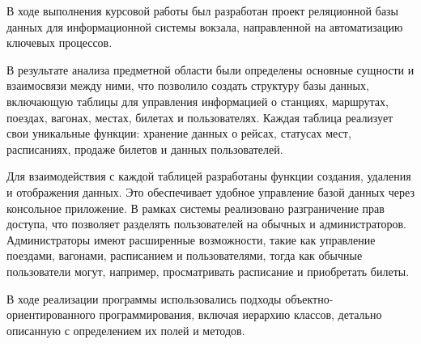 
В ходе выполнения курсовой работы был разработан проект реляционной базы данных для информационной системы вокзала, направленной на автоматизацию ключевых процессов.

В результате анализа предметной области были определены основные сущности и взаимосвязи между ними, что позволило создать структуру базы данных, включающую таблицы для управления информацией о станциях, маршрутах, поездах, вагонах, местах, билетах и пользователях. Каждая таблица реализует свои уникальные функции: хранение данных о рейсах, статусах мест, расписаниях, продаже билетов и данных пользователей.

Для взаимодействия с каждой таблицей разработаны функции создания, удаления и отображения данных. Это обеспечивает удобное управление базой данных через консольное приложение. В рамках системы реализовано разграничение прав доступа, что позволяет разделять пользователей на обычных и администраторов. Администраторы имеют расширенные возможности, такие как управление поездами, вагонами, расписанием и пользователями, тогда как обычные пользователи могут, например, просматривать расписание и приобретать билеты.

В ходе реализации программы использовались подходы объектно-
ориентированного программирования, включая иерархию классов, детально описанную с определением их полей и методов.